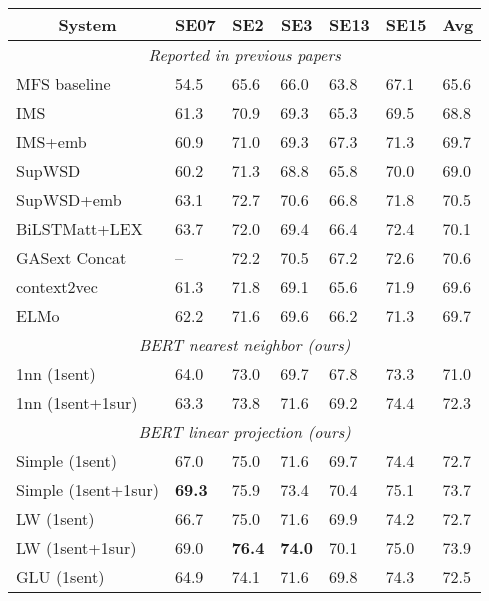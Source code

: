 \documentclass[11pt,a4paper]{article}
\begin{document}
\begin{table*}[ht]
\centering
\begin{tabular}{|l|l||l|l|l|l|l|}
\hline
\multicolumn{1}{|c|}{\textbf{System}} & \multicolumn{1}{c||}{\textbf{SE07}} & \multicolumn{1}{c|}{\textbf{SE2}} & \multicolumn{1}{c|}{\textbf{SE3}} & \multicolumn{1}{c|}{\textbf{SE13}} & \multicolumn{1}{c|}{\textbf{SE15}} & \multicolumn{1}{c|}{\textbf{Avg}}\\
\hline
\multicolumn{7}{|c|}{\textit{Reported in previous papers}}\\
\hline
MFS baseline & 54.5 & 65.6 & 66.0 & 63.8 & 67.1 & 65.6\\
\hline
IMS \cite{zhong_it_2010} & 61.3 & 70.9 & 69.3 & 65.3 & 69.5 & 68.8\\
IMS+emb \cite{iacobacci_embeddings_2016} & 60.9 & 71.0 & 69.3 & 67.3 & 71.3 & 69.7\\
SupWSD \cite{papandrea_supwsd:_2017} & 60.2 & 71.3 & 68.8 & 65.8 & 70.0 & 69.0\\
SupWSD+emb \cite{papandrea_supwsd:_2017} & 63.1 & 72.7 & 70.6 & 66.8 & 71.8 & 70.5\\
\hline
BiLSTMatt+LEX \cite{raganato_neural_2017} & 63.7 & 72.0 & 69.4 & 66.4 & 72.4 & 70.1\\
GASext Concat \cite{luo_incorporating_2018} & -- & 72.2 & 70.5 & 67.2 & 72.6 & 70.6\\
\hline
context2vec \cite{melamud_context2vec:_2016} & 61.3 & 71.8 & 69.1 & 65.6 & 71.9 & 69.6\\
ELMo \cite{peters_deep_2018} & 62.2 & 71.6 & 69.6 & 66.2 & 71.3 & 69.7\\
\hline
\multicolumn{7}{|c|}{\textit{BERT nearest neighbor (ours)}}\\
\hline
1nn (1sent) & 64.0 & 73.0 & 69.7 & 67.8 & 73.3 & 71.0\\
1nn (1sent+1sur) & 63.3 & 73.8 & 71.6 & 69.2 & 74.4 & 72.3\\
\hline
\multicolumn{7}{|c|}{\textit{BERT linear projection (ours)}}\\
\hline
Simple (1sent) & 67.0 & 75.0 & 71.6 & 69.7 & 74.4 & 72.7\\
Simple (1sent+1sur) & \textbf{69.3} & 75.9 & 73.4 & 70.4 & 75.1 & 73.7\\\hline
LW (1sent) & 66.7 & 75.0 & 71.6 & 69.9 & 74.2 & 72.7 \\
LW (1sent+1sur) & 69.0 & \textbf{76.4} & \textbf{74.0} & 70.1 & 75.0 & 73.9\\\hline
GLU (1sent) & 64.9 & 74.1 & 71.6 & 69.8 & 74.3 & 72.5 \\

\end{tabular}
\end{table*}
\end{document}
